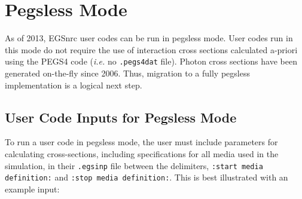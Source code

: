 
%
%
%
%
%
%
%
%
%




\section{Pegsless Mode}
\label{pegsless}

As of 2013, EGSnrc user codes can be run in pegsless mode.  User codes run in this mode do not
require the use of interaction cross sections calculated a-priori using the PEGS4 code
({\em i.e.} no {\tt .pegs4dat} file).  Photon cross
sections have been generated on-the-fly since 2006.  Thus, migration to a fully pegsless implementation
is a logical next step.

\subsection{User Code Inputs for Pegsless Mode}
\label{pegslessinputsect}

To run a user code in pegsless mode, the user must include parameters for calculating cross-sections, including
specifications for all media used in the simulation, in their {\tt .egsinp} file between the
delimiters, {\tt :start media definition:} and {\tt :stop media definition:}.  This is best illustrated
with an example input:


